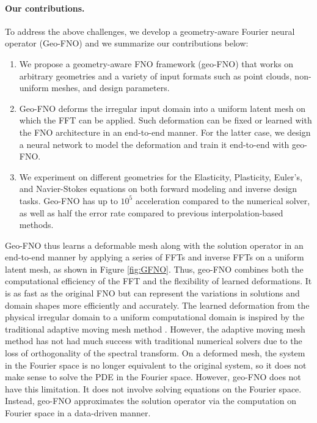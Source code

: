 \documentclass{article}
\begin{document}
\paragraph{Our contributions.}
To address the above challenges, we develop a geometry-aware Fourier neural operator (Geo-FNO) and we summarize our contributions below:
\begin{enumerate}[leftmargin=*]
    \item We propose a geometry-aware FNO framework (geo-FNO) that works on arbitrary geometries and a variety of input formats such as point clouds, non-uniform meshes,  and design parameters.
    \item Geo-FNO deforms the irregular input domain into a uniform latent mesh on which the FFT can be applied. Such deformation can be fixed or learned with the FNO architecture in an end-to-end manner. For the latter case, we design a neural network to model the deformation and train it end-to-end with geo-FNO.
    \item We experiment on different geometries for the Elasticity, Plasticity, Euler's, and Navier-Stokes equations
    on both forward modeling and inverse design tasks. 
    Geo-FNO has up to $10^5$  acceleration compared to the numerical solver, as well as half the error rate compared to previous interpolation-based methods.
\end{enumerate}



Geo-FNO thus learns a deformable mesh along with the solution operator in an end-to-end manner by applying a series of FFTs and inverse FFTs on a uniform latent mesh, as shown in Figure \ref{fig:GFNO}.   
Thus, geo-FNO combines both the computational efficiency of the FFT  and the flexibility of learned deformations. It is as fast as the original FNO but can represent the variations in solutions and domain shapes more efficiently and accurately. The learned deformation from the physical irregular domain to a uniform computational domain is inspired by the traditional adaptive moving mesh method \citep{huang2010adaptive}. However, the adaptive moving mesh method has not had much success with traditional numerical solvers due to the loss of orthogonality of the spectral transform. On a deformed mesh, the system in the Fourier space is no longer equivalent to the original system, so it does not make sense to solve the PDE in the Fourier space. 
However, geo-FNO does not have this limitation. It does not involve solving equations on the Fourier space. Instead, geo-FNO approximates the solution operator via the computation on Fourier space in a data-driven manner.
\end{document}
